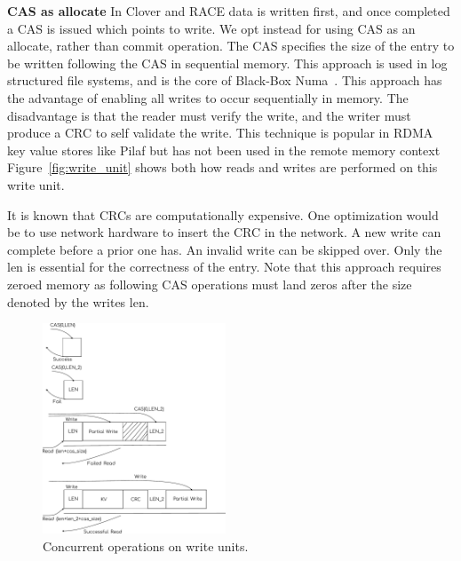 \textbf{CAS as allocate} In Clover and RACE data is written first, and once
completed a CAS is issued which points to write. We opt instead for using CAS as
an allocate, rather than commit operation. The CAS specifies the size of the
entry to be written following the CAS in sequential memory. This approach is
used in log structured file systems, and is the core of Black-Box
Numa~\cite{black-box-numa}.  This approach has the advantage of enabling all
writes to occur sequentially in memory. The disadvantage is that the reader must
verify the write, and the writer must produce a CRC to self validate the write.
This technique is popular in RDMA key value stores like Pilaf but has not been
used in the remote memory context~\cite{pilaf,clover}
Figure~\ref{fig:write_unit} shows both how reads and writes are performed on
this write unit. 

It is known that CRCs are computationally expensive.  One optimization would be
to use network hardware to insert the CRC in the network.  A new write can
complete before a prior one has. An invalid write can be skipped over. Only the
len is essential for the correctness of the entry. Note that this approach
requires zeroed memory as following CAS operations must land zeros after the
size denoted by the writes len.

\begin{figure}[t] \includegraphics[width=0.485\textwidth]{fig/AppendList.pdf}
\caption{Concurrent operations on write units.}
\label{fig:append_list}
\end{figure}

